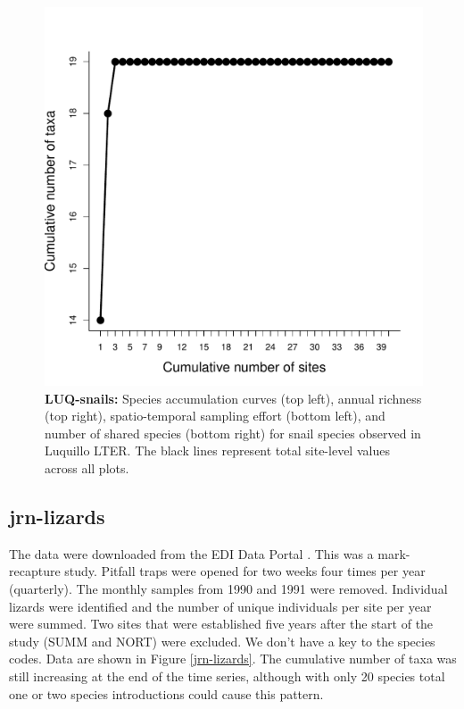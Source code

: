 \documentclass[11pt, oneside]{article}
\begin{document}
\begin{figure}[h!]
\includegraphics[scale = 0.4]{luq-snails-compagnoni_species_accumulation_space.pdf}
\caption{{\bf LUQ-snails:} Species accumulation curves (top left),  annual richness (top right), spatio-temporal sampling effort (bottom left), and number of shared species (bottom right) for snail species observed in Luquillo LTER. The black lines represent total site-level values across all plots.}
\label{luq-snails}
\end{figure}


\subsection {jrn-lizards}
The data were downloaded from the EDI Data Portal \citep{jrn-lizard}.
This was a mark-recapture study. 
Pitfall traps were opened for two weeks four times per year (quarterly). 
The monthly samples from 1990 and 1991 were removed.
Individual lizards were identified and the number of unique individuals per site per year were summed. 
Two sites that were established five years after the start of the study (SUMM and NORT) were excluded. 
We don't have a key to the species codes.
Data are shown in Figure \ref{jrn-lizards}.
The cumulative number of taxa was still increasing at the end of the time series, although with only 20 species total one or two species introductions could cause this pattern.
\end{document}
